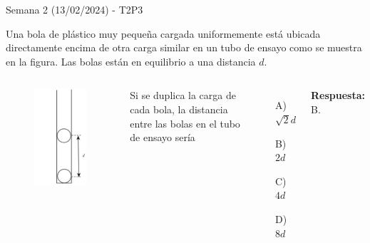 \begin{frame}{Semana 2 (13/02/2024) - T2P3}
    
    Una bola de plástico muy pequeña cargada uniformemente está ubicada directamente encima de otra carga similar en un tubo de ensayo como se muestra en la figura. Las bolas están en equilibrio a una distancia $d$.
    
    \begin{columns}
     \begin{figure}
        \centering
        \includegraphics[scale=0.3]{figures/t2p3.png}
    \end{figure}
    

Si se duplica la carga de cada bola, la distancia entre las bolas en el tubo de ensayo sería
    
     \begin{itemize}
        \item[A)] $\sqrt{2}d$
        \item[B)] $2d$
        \item[C)] $4d$
        \item[D)] $8d$
    \end{itemize}
    
    \pause\bigskip\centering\textbf{Respuesta:} B.

    \end{columns}
    
\end{frame}

